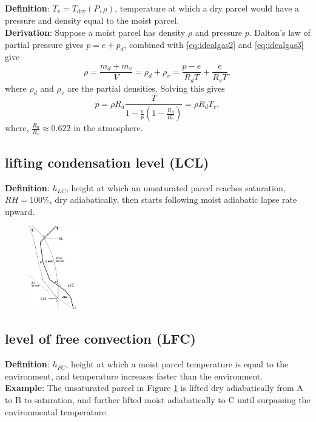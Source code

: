 {\bf Definition}: $T_v = T_\text{dry}(P,\rho)$, temperature at which a dry parcel would have a
pressure and density equal to the moist parcel. \\

{\bf Derivation}: Suppose a moist parcel has density $\rho$ and pressure $p$.
Dalton's law of partial pressure gives $p = e + p_d$, combined with \eqref{eq:idealgas2} and
\eqref{eq:idealgas3} give
\begin{equation}
   \rho = \frac{m_d + m_v}{V} = \rho_d + \rho_v = \frac{p-e}{R_dT} + \frac{e}{R_vT}, 
\end{equation}
where $\rho_d$ and $\rho_v$ are the partial densities.
Solving this gives
\begin{equation}
   p = \rho R_d \frac{T}{1-\frac{e}{p}(1-\frac{R_d}{R_v})} = \rho R_d T_v,
\end{equation}
where, $\frac{R_d}{R_v} \approx 0.622$ in the atmosphere. \\

\subsection{lifting condensation level (LCL)}
{\bf Definition}: $h_{LC}$, height at which an unsaturated parcel reaches saturation, $RH=100\%$, dry
adiabatically, then starts following moist adiabatic lapse rate upward. 
\begin{figure} [H] 
   \includegraphics[width=0.2\textwidth, height=0.3\textwidth]{sounding.png}
   \caption{\label{sounding}}
\end{figure}

\subsection{level of free convection (LFC)}
{\bf Definition}: $h_{FC}$, height at which a moist parcel temperature is equal to the environment,
and temperature increases faster than the environment. \\

{\bf Example}: The unsaturated parcel in Figure {\ref{sounding}} is lifted dry adiabatically from A
to B to saturation, and further lifted moist adiabatically to C until surpassing the environmental
temperature.

